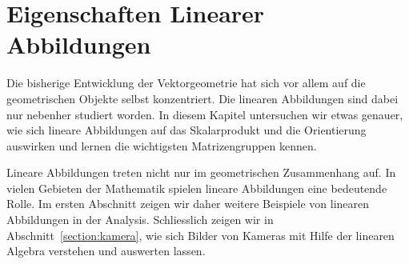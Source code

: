%
%
%
\chapter{Eigenschaften Linearer Abbildungen\label{chapter:eigenschaften}}
\rhead{}
Die bisherige Entwicklung der Vektorgeometrie hat sich vor allem auf
die geometrischen Objekte selbst konzentriert. 
Die linearen Abbildungen sind dabei nur nebenher studiert worden.
In diesem Kapitel untersuchen wir etwas genauer, wie sich lineare Abbildungen
auf das Skalarprodukt und die Orientierung auswirken und lernen die
wichtigsten Matrizengruppen kennen.

Lineare Abbildungen treten nicht nur im geometrischen Zusammenhang auf.
In vielen Gebieten der Mathematik spielen lineare Abbildungen eine
bedeutende Rolle.
Im ersten Abschnitt zeigen wir daher weitere Beispiele von linearen
Abbildungen in der Analysis.
Schliesslich zeigen wir in Abschnitt~\ref{section:kamera}, wie sich
Bilder von Kameras mit Hilfe der linearen Algebra verstehen und auswerten
lassen.





%






